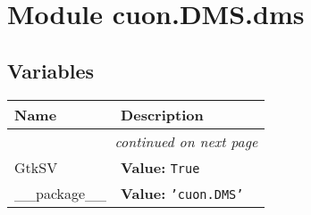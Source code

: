%
%
%


\section{Module cuon.DMS.dms}

    \label{cuon:DMS:dms}


  \subsection{Variables}

    \vspace{-1cm}
\hspace{\varindent}\begin{longtable}{|p{\varnamewidth}|p{\vardescrwidth}|l}
\cline{1-2}
\cline{1-2} \centering \textbf{Name} & \centering \textbf{Description}& \\
\cline{1-2}
\endhead\cline{1-2}\multicolumn{3}{r}{\small\textit{continued on next page}}\\\endfoot\cline{1-2}
\endlastfoot\raggedright G\-t\-k\-S\-V\- & \raggedright \textbf{Value:} 
{\tt True}&\\
\cline{1-2}
\raggedright \_\-\_\-p\-a\-c\-k\-a\-g\-e\-\_\-\_\- & \raggedright \textbf{Value:} 
{\tt \texttt{'}\texttt{cuon.DMS}\texttt{'}}&\\
\cline{1-2}
\end{longtable}




